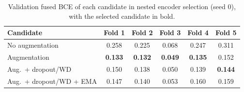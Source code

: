 \begin{table}[!htbp]
\centering
\caption{Validation fused BCE of each candidate in nested encoder selection (seed 0), with the selected candidate in bold.}
\label{tab:s-selection}
\footnotesize
\begin{tabular}{@{}lccccc@{}}
\toprule
Candidate & Fold 1 & Fold 2 & Fold 3 & Fold 4 & Fold 5\\
\midrule
No augmentation & 0.258 & 0.225 & 0.068 & 0.247 & 0.311\\
Augmentation & \textbf{0.133} & \textbf{0.132} & \textbf{0.049} & \textbf{0.135} & 0.152\\
Aug.\ + dropout/WD & 0.150 & 0.138 & 0.050 & 0.139 & \textbf{0.144}\\
Aug.\ + dropout/WD + EMA & 0.147 & 0.140 & 0.053 & 0.160 & 0.159\\
\bottomrule
\end{tabular}
\end{table}
